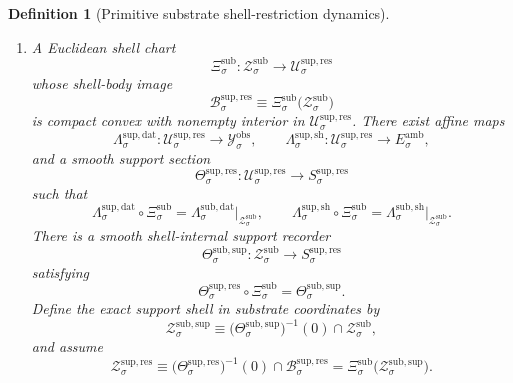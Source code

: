 \documentclass[11pt]{article}
\newcommand{\DataSpace}[1]{\mathcal Y_{#1}^{\mathrm{obs}}}
\newcommand{\AmbientTarget}[1]{E_{#1}^{\mathrm{amb}}}
\newcommand{\EqnTarget}[1]{Q_{#1}^{\mathrm{eqn}}}
\newcommand{\EqnPair}[1]{\mathfrak b_{#1}^{\mathrm{eqn}}}
\newcommand{\ResSpace}[1]{\mathcal U_{#1}^{\mathrm{sup,res}}}
\newcommand{\ResBody}[1]{\mathcal B_{#1}^{\mathrm{sup,res}}}
\newcommand{\ResTarget}[1]{S_{#1}^{\mathrm{sup,res}}}
\newcommand{\ResSection}[1]{\Theta_{#1}^{\mathrm{sup,res}}}
\newcommand{\ResData}[1]{\Lambda_{#1}^{\mathrm{sup,dat}}}
\newcommand{\ResShellMap}[1]{\Lambda_{#1}^{\mathrm{sup,sh}}}
\newcommand{\ResShellSet}[1]{\mathcal Z_{#1}^{\mathrm{sup,res}}}
\newcommand{\SubSpace}[1]{\mathcal M_{#1}^{\mathrm{sub}}}
\newcommand{\SubBody}[1]{\mathcal B_{#1}^{\mathrm{sub}}}
\newcommand{\SubSection}[1]{\Sigma_{#1}^{\mathrm{sub}}}
\newcommand{\SubShellSet}[1]{\mathcal Z_{#1}^{\mathrm{sub}}}
\newcommand{\SubData}[1]{\Lambda_{#1}^{\mathrm{sub,dat}}}
\newcommand{\SubShellMap}[1]{\Lambda_{#1}^{\mathrm{sub,sh}}}
\newcommand{\SubSym}[1]{\mathbb G_{#1}^{\mathrm{sub}}}
\newcommand{\SubTime}[1]{\vartheta_{#1}^{\mathrm{sub}}}
\newcommand{\SubChart}[1]{\Xi_{#1}^{\mathrm{sub}}}
\newcommand{\SubSupport}[1]{\Theta_{#1}^{\mathrm{sub,sup}}}
\newcommand{\SubSupportShell}[1]{\mathcal Z_{#1}^{\mathrm{sub,sup}}}
\newtheorem{definition}{Definition}
\begin{document}
\begin{definition}[Primitive substrate shell-restriction dynamics]
\begin{enumerate}
\[    \]
    and a positive-definite symmetric hidden pairing
    \[
    \EqnPair{\sigma}:
    \EqnTarget{\sigma}\times\EqnTarget{\sigma}\to\mathbb R.
    \]
    There is also a compact symmetry group
    \[
    \SubSym{\sigma}
    \]
    and an involution
    \[
    \SubTime{\sigma},
    \]
    acting orthogonally on \(\SubSpace{\sigma}\), \(\DataSpace{\sigma}\), \(\AmbientTarget{\sigma}\), and \(\ResTarget{\sigma}\), and by \(\EqnPair{\sigma}\)-isometries on \(\EqnTarget{\sigma}\), preserving \(\SubBody{\sigma}\), \(\SubShellSet{\sigma}\), \(\SubSection{\sigma}\), \(\SubData{\sigma}\), and \(\SubShellMap{\sigma}\).
    \item A Euclidean shell chart
    \[
    \SubChart{\sigma}:\SubShellSet{\sigma}\to\ResSpace{\sigma}
    \]
    whose shell-body image
    \[
    \ResBody{\sigma}
    \equiv
    \SubChart{\sigma}\bigl(\SubShellSet{\sigma}\bigr)
    \]
    is compact convex with nonempty interior in \(\ResSpace{\sigma}\). There exist affine maps
    \[
    \ResData{\sigma}:\ResSpace{\sigma}\to\DataSpace{\sigma},
    \qquad
    \ResShellMap{\sigma}:\ResSpace{\sigma}\to\AmbientTarget{\sigma},
    \]
    and a smooth support section
    \[
    \ResSection{\sigma}:\ResSpace{\sigma}\to\ResTarget{\sigma}
    \]
    such that
    \begin{equation}
    \ResData{\sigma}\circ\SubChart{\sigma}
    =
    \SubData{\sigma}\big|_{\SubShellSet{\sigma}},
    \qquad
    \ResShellMap{\sigma}\circ\SubChart{\sigma}
    =
    \SubShellMap{\sigma}\big|_{\SubShellSet{\sigma}}.
    \label{eq:subchartreadouts}
    \end{equation}
    There is a smooth shell-internal support recorder
    \[
    \SubSupport{\sigma}:\SubShellSet{\sigma}\to\ResTarget{\sigma}
    \]
    satisfying
    \begin{equation}
    \ResSection{\sigma}\circ\SubChart{\sigma}
    =
    \SubSupport{\sigma}.
    \label{eq:supporttransport}
    \end{equation}
    Define the exact support shell in substrate coordinates by
    \begin{equation}
    \SubSupportShell{\sigma}
    \equiv
    \bigl(\SubSupport{\sigma}\bigr)^{-1}(0)\cap\SubShellSet{\sigma},
    \label{eq:subsupportshell}
    \end{equation}
    and assume
    \begin{equation}
    \ResShellSet{\sigma}
    \equiv
    \bigl(\ResSection{\sigma}\bigr)^{-1}(0)\cap\ResBody{\sigma}
    =
    \SubChart{\sigma}\bigl(\SubSupportShell{\sigma}\bigr).
    \label{eq:transportedsupportshell}

\end{equation}
\end{enumerate}
\end{definition}
\end{document}
